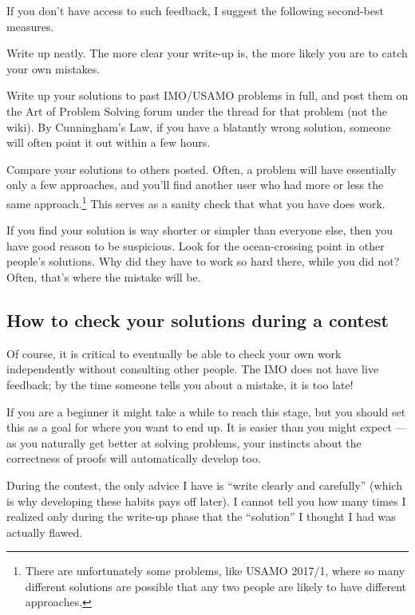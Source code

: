 \documentclass[11pt]{scrartcl}
\begin{document}
If you don't have access to such feedback,
I suggest the following second-best measures.
\begin{itemize}
  \ii Write up neatly.
  The more clear your write-up is,
  the more likely you are to catch your own mistakes.

  \ii Write up your solutions to past IMO/USAMO problems in full,
  and post them on the Art of Problem Solving forum
  under the thread for that problem (not the wiki).
  By Cunningham's Law, if you have a blatantly wrong solution,
  someone will often point it out within a few hours.

  \ii Compare your solutions to others posted.
  Often, a problem will have essentially only a few approaches,
  and you'll find another user who had more or less
  the same approach.\footnote{There are unfortunately some problems,
    like USAMO 2017/1,
    where so many different solutions are possible
    that any two people are likely to have different approaches.}
  This serves as a sanity check that what you have does work.

  If you find your solution is way shorter or simpler
  than everyone else, then you have good reason to be suspicious.
  Look for the ocean-crossing point in other people's solutions.
  Why did they have to work so hard there, while you did not?
  Often, that's where the mistake will be.
\end{itemize}

\subsection{How to check your solutions during a contest}
Of course, it is critical to eventually
be able to check your own work independently
without consulting other people.
The IMO does not have live feedback;
by the time someone tells you about a mistake, it is too late!

If you are a beginner it might take a while to reach this stage,
but you should set this as a goal for where you want to end up.
It is easier than you might expect ---
as you naturally get better at solving problems, your instincts
about the correctness of proofs will automatically develop too.

During the contest, the only advice I have is
``write clearly and carefully''
(which is why developing these habits pays off later).
I cannot tell you how many times I realized only during the write-up phase
that the ``solution'' I thought I had was actually flawed.
\end{document}

